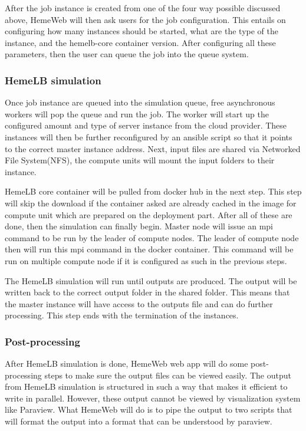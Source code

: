 After the job instance is created from one of the four way possible discussed above, HemeWeb will then ask users for the job configuration. This entails on configuring how many instances should be started, what are the type of the instance, and the hemelb-core container version.  After configuring all these parameters, then the user can queue the job into the queue system.	



\subsubsection{HemeLB simulation}

Once job instance are queued into the simulation queue, free asynchronous workers will pop the queue and run the job. The worker will start up the configured amount and type of server instance from the cloud provider. These instances will then be further reconfigured by an ansible script so that it points to the correct master instance address. Next, input files are shared via Networked File System(NFS), the compute units will mount the input folders to their instance. 

HemeLB core container will be pulled from docker hub in the next step. This step will skip the download if the container asked are already cached in the image for compute unit which are prepared on the deployment part. After all of these are done, then the simulation can finally begin. Master node will issue an mpi command to be run by the leader of compute nodes. The leader of compute node then will run this mpi command in the docker container. This command will be run on multiple compute node if it is configured as such in the previous steps. 

The HemeLB simulation will run until outputs are produced. The output will be written back to the correct output folder in the shared folder. This means that the master instance will have access to the outputs file and can do further processing. This step ends with the termination of the instances.


\subsubsection{Post-processing}

After HemeLB simulation is done, HemeWeb web app will do some post-processing steps to make sure the output files can be viewed easily. The output from HemeLB simulation is structured in such a way that makes it efficient to write in parallel. However, these output cannot be viewed by visualization system like Paraview. What HemeWeb will do is to pipe the output to two scripts that will format the output into a format that can be understood by paraview.


